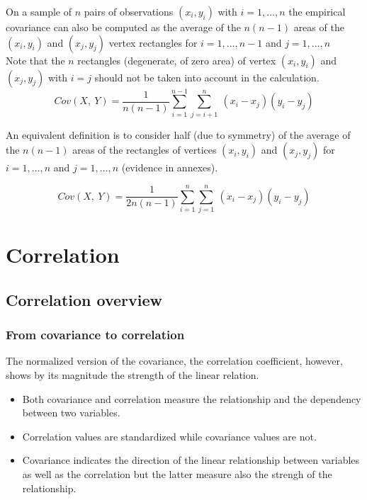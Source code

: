 \documentclass[
]{report}
\providecommand{\tightlist}{%
  \setlength{\itemsep}{0pt}\setlength{\parskip}{0pt}}
\begin{document}
On a sample of \(n\) pairs of observations \((x_i,y_i)\) with \(i=1,\dots, n\) the empirical covariance can also be computed as the average of the \(n(n-1)\) areas of the \((x_i,y_i)\) and \((x_j,y_j)\) vertex rectangles for \(i=1,\dots, n-1\) and \(j=1,\dots, n\)\\
Note that the \(n\) rectangles (degenerate, of zero area) of vertex \((x_i,y_i)\) and \((x_j,y_j)\) with \(i=j\) should not be taken into account in the calculation.
\[
Cov(X,~Y)=\frac{1}{n(n-1)}\sum_{i=1}^{n-1} \sum_{j=i+1}^{n}~(x_i-x_j)(y_i-y_j)
\]

An equivalent definition is to consider half (due to symmetry) of the average of the \(n(n-1)\) areas of the rectangles of vertices \((x_i,y_i)\) and \((x_j,y_j)\) for \(i=1,\dots, n\) and \(j=1,\dots, n\) (evidence in annexes).

\[
Cov(X,~Y)=\frac{1}{2n(n-1)}
\sum_{i=1}^{n} \sum_{j=1}^{n}~(x_i-x_j)(y_i-y_j)
\]

\hypertarget{correlation}{%
\chapter{Correlation}\label{correlation}}

\hypertarget{correlation-overview}{%
\section{Correlation overview}\label{correlation-overview}}

\hypertarget{from-covariance-to-correlation}{%
\subsection{From covariance to correlation}\label{from-covariance-to-correlation}}

The normalized version of the covariance, the correlation coefficient, however, shows by its magnitude the strength of the linear relation.

\begin{itemize}
\tightlist
\item
  Both covariance and correlation measure the relationship and the dependency between two variables.
\item
  Correlation values are standardized while covariance values are not.
\item
  Covariance indicates the direction of the linear relationship between variables as well as the correlation but the latter measure also the strengh of the relationship.
\end{itemize}
\end{document}
